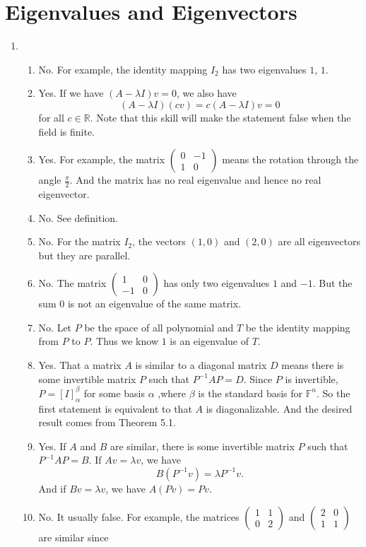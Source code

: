 \section{Eigenvalues and Eigenvectors}
\begin{enumerate}
\item \begin{enumerate}
\item No. For example, the identity mapping $I_2$ has two eigenvalues $1$, $1$.
\item Yes. If we have $(A-\lambda I)v=0$, we also have 
\[(A-\lambda I)(cv)=c(A-\lambda I)v=0\]
for all $c\in \mathbb{R}$. Note that this skill will make the statement false when the field is finite.
\item Yes. For example, the matrix $\begin{pmatrix}0&-1\\1&0\end{pmatrix}$ means the rotation through the angle $\frac{\pi}{2}$. And the matrix has no real eigenvalue and hence no real eigenvector.
\item No. See definition.
\item No. For the matrix $I_2$, the vectors $(1,0)$ and $(2,0)$ are all eigenvectors but they are parallel.
\item No. The matrix $\begin{pmatrix}1&0\\-1&0\end{pmatrix}$ has only two eigenvalues $1$ and $-1$. But the sum $0$ is not an eigenvalue of the same matrix.
\item No. Let $P$ be the space of all polynomial and $T$ be the identity mapping from $P$ to $P$. Thus we know $1$ is an eigenvalue of $T$.
\item Yes. That a matrix $A$ is similar to a diagonal matrix $D$ means there is some invertible matrix $P$ such that  $P^{-1}AP=D$. Since $P$ is invertible, $P=[I]_{\alpha }^{\beta }$ for some basis $\alpha $ ,where $\beta $ is the standard basis for $\mathbb{F}^n$. So the first statement is equivalent to that $A$ is diagonalizable. And the desired result comes from Theorem 5.1.
\item Yes. If $A$ and $B$ are similar, there is some invertible matrix $P$ such that $P^{-1}AP=B$. If $Av=\lambda v$, we have 
\[B(P^{-1}v)=\lambda P^{-1}v.\]
And if $Bv=\lambda v$, we have $A(Pv)=Pv$.
\item No. It usually false. For example, the matrices $\begin{pmatrix}1&1\\0&2\end{pmatrix}$ and $\begin{pmatrix}2&0\\1&1\end{pmatrix}$ are similar since 

\end{enumerate}
\end{enumerate}
